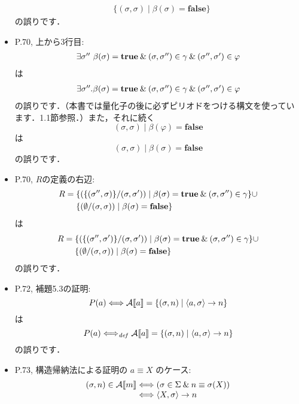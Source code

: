 \documentclass[12pt,titlepage,twoside,openright,dvipdfmx]{jsbook}
\theoremstyle{definition}
\begin{document}
\begin{itemize}
\begin{align*}
                 & \{(\sigma,\sigma)\mid \beta(\sigma)=\mathbf{false} \}
  \end{align*}
  の誤りです．
\item P.70, 上から3行目:
  \[
    \begin{array}{l}
      \exists{\sigma''}\ \beta(\sigma)=\mathbf{true}\mathbin{\&}
      (\sigma,\sigma'')\in\gamma \mathbin{\&}
      (\sigma'',\sigma')\in\varphi
    \end{array}
  \]
  は
  \[
    \begin{array}{l}
      \exists{\sigma''}. \beta(\sigma)=\mathbf{true}\mathbin{\&}
      (\sigma,\sigma'')\in\gamma \mathbin{\&}
      (\sigma'',\sigma')\in\varphi
    \end{array}
  \]
  の誤りです．（本書では量化子の後に必ずピリオドをつける構文を使ってい
  ます．1.1節参照．）また，それに続く
  \[
    (\sigma,\sigma)\mid  \beta(\varphi)=\mathbf{false}
  \]
  は
  \[
    (\sigma,\sigma)\mid  \beta(\sigma)=\mathbf{false}
  \]
  の誤りです．
\item P.70, $R$の定義の右辺:
  \begin{align*}
    R = {} &\{(\{(\sigma'',\sigma)\}/(\sigma,\sigma'))\mid
             \beta(\sigma)=\mathbf{true}\mathbin{\&}
             (\sigma,\sigma'')\in\gamma \} \cup \\
           &\{(\emptyset/(\sigma,\sigma))\mid \beta(\sigma)=\mathbf{false}\}
  \end{align*}
  は
  \begin{align*}
    R = {} &\{(\{(\sigma'',\sigma')\}/(\sigma,\sigma'))\mid
             \beta(\sigma)=\mathbf{true}\mathbin{\&}
             (\sigma,\sigma'')\in\gamma \} \cup \\
           &\{(\emptyset/(\sigma,\sigma))\mid \beta(\sigma)=\mathbf{false}\}
  \end{align*}
  の誤りです．
\item P.72, 補題5.3の証明:
  \[
    P(a)\Longleftrightarrow
    \mathcal{A}\llbracket{a}\rrbracket=\{ (\sigma,n) \mid   \langle{a,\sigma}\rangle\rightarrow n\}
  \]
  は
  \[
    P(a)\Longleftrightarrow_{\mathit{def}}
    \mathcal{A}\llbracket{a}\rrbracket=\{ (\sigma,n) \mid   \langle{a,\sigma}\rangle\rightarrow n\}
  \]
  の誤りです．
\item P.73, 構造帰納法による証明の $a \equiv X$ のケース:
  \[
    \begin{array}{l@{}l}
      (\sigma, n)\in\denotation{A}{m}
      & {} \Longleftrightarrow (\sigma\in\Sigma\AND n\equiv \sigma(X)) \\
      & {} \Longleftrightarrow \tuple{X,\sigma}\rightarrow n
    \end{array}
\]
\end{itemize}
\end{document}
